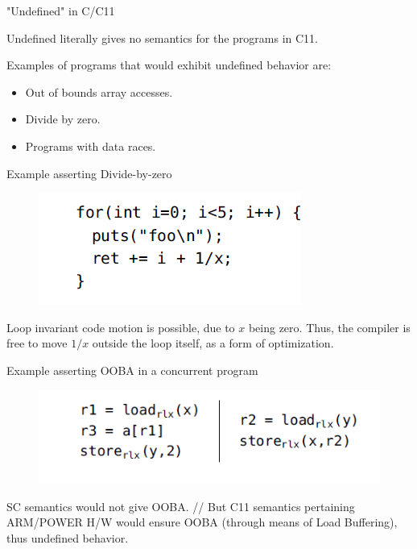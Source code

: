 \documentclass{beamer}
\begin{document}
    \begin{frame}{"Undefined" in C/C11}

        Undefined literally gives no semantics for the programs in C11.

        Examples of programs that would exhibit undefined behavior are:
        \begin{itemize}
            \item Out of bounds array accesses.
            \item Divide by zero.
            \item Programs with data races.
        \end{itemize}

        
    \end{frame}

    \begin{frame}{Example asserting Divide-by-zero}
        
        \begin{figure}
            \centering
            \includegraphics[scale=0.7]{DIV-ZERO.PNG}
        \end{figure}

        Loop invariant code motion is possible, due to $x$ being zero.
        Thus, the compiler is free to move $1/x$ outside the loop itself, as a form of optimization.

    \end{frame}

    \begin{frame}{Example asserting OOBA in a concurrent program}
        \begin{figure}
            \centering
            \includegraphics[scale=0.7]{OOBA+RLX.PNG}
        \end{figure}

        SC semantics would not give OOBA. //
        But C11 semantics pertaining ARM/POWER H/W would ensure OOBA (through means of Load Buffering), thus undefined behavior.
    \end{frame}
\end{document}
